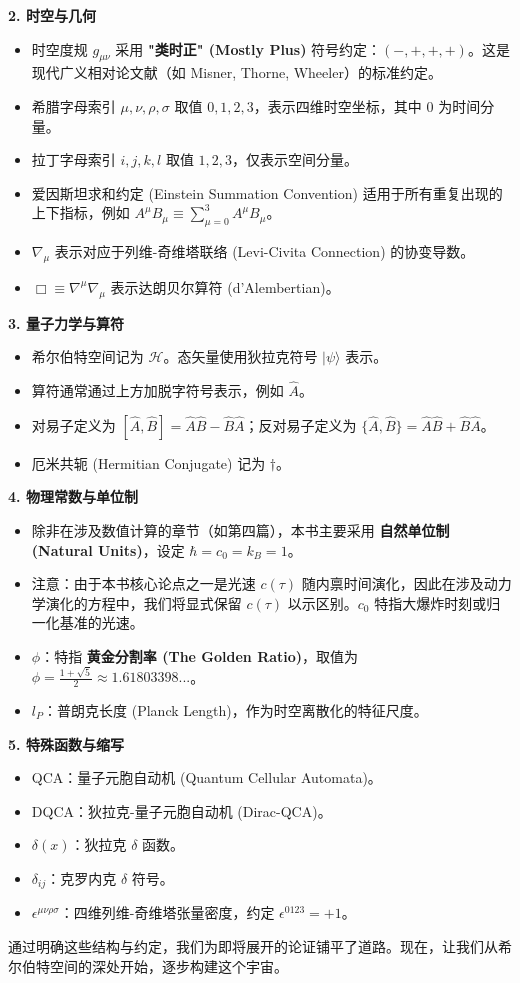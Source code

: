 \textbf{2. 时空与几何}
\begin{itemize}
\item 时空度规 $g_{\mu\nu}$ 采用 \textbf{"类时正" (Mostly Plus)} 符号约定：$(-, +, +, +)$。这是现代广义相对论文献（如 Misner, Thorne, Wheeler）的标准约定。
\item 希腊字母索引 $\mu, \nu, \rho, \sigma$ 取值 $0, 1, 2, 3$，表示四维时空坐标，其中 $0$ 为时间分量。
\item 拉丁字母索引 $i, j, k, l$ 取值 $1, 2, 3$，仅表示空间分量。
\item 爱因斯坦求和约定 (Einstein Summation Convention) 适用于所有重复出现的上下指标，例如 $A^\mu B_\mu \equiv \sum_{\mu=0}^3 A^\mu B_\mu$。
\item $\nabla_\mu$ 表示对应于列维-奇维塔联络 (Levi-Civita Connection) 的协变导数。
\item $\Box \equiv \nabla^\mu \nabla_\mu$ 表示达朗贝尔算符 (d'Alembertian)。
\end{itemize}

\textbf{3. 量子力学与算符}
\begin{itemize}
\item 希尔伯特空间记为 $\mathcal{H}$。态矢量使用狄拉克符号 $|\psi\rangle$ 表示。
\item 算符通常通过上方加脱字符号表示，例如 $\hat{A}$。
\item 对易子定义为 $[\hat{A}, \hat{B}] = \hat{A}\hat{B} - \hat{B}\hat{A}$；反对易子定义为 $\{\hat{A}, \hat{B}\} = \hat{A}\hat{B} + \hat{B}\hat{A}$。
\item 厄米共轭 (Hermitian Conjugate) 记为 $\dagger$。
\end{itemize}

\textbf{4. 物理常数与单位制}
\begin{itemize}
\item 除非在涉及数值计算的章节（如第四篇），本书主要采用 \textbf{自然单位制 (Natural Units)}，设定 $\hbar = c_0 = k_B = 1$。
\item 注意：由于本书核心论点之一是光速 $c(\tau)$ 随内禀时间演化，因此在涉及动力学演化的方程中，我们将显式保留 $c(\tau)$ 以示区别。$c_0$ 特指大爆炸时刻或归一化基准的光速。
\item $\phi$：特指 \textbf{黄金分割率 (The Golden Ratio)}，取值为 $\phi = \frac{1+\sqrt{5}}{2} \approx 1.61803398...$。
\item $l_P$：普朗克长度 (Planck Length)，作为时空离散化的特征尺度。
\end{itemize}

\textbf{5. 特殊函数与缩写}
\begin{itemize}
\item QCA：量子元胞自动机 (Quantum Cellular Automata)。
\item DQCA：狄拉克-量子元胞自动机 (Dirac-QCA)。
\item $\delta(x)$：狄拉克 $\delta$ 函数。
\item $\delta_{ij}$：克罗内克 $\delta$ 符号。
\item $\epsilon^{\mu\nu\rho\sigma}$：四维列维-奇维塔张量密度，约定 $\epsilon^{0123} = +1$。
\end{itemize}

通过明确这些结构与约定，我们为即将展开的论证铺平了道路。现在，让我们从希尔伯特空间的深处开始，逐步构建这个宇宙。
